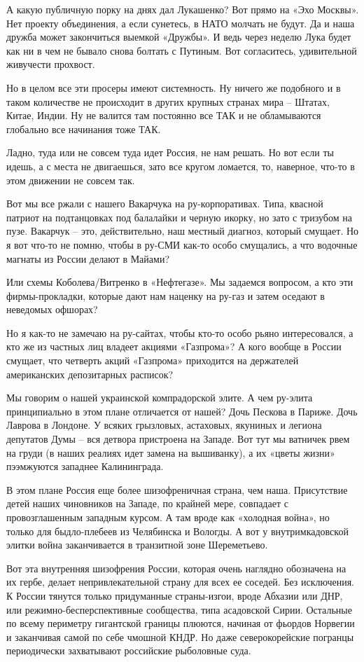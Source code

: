 А какую публичную порку на днях дал Лукашенко? Вот прямо на «Эхо Москвы». Нет
проекту объединения, а если сунетесь, в НАТО молчать не будут. Да и наша дружба
может закончиться выемкой «Дружбы». И ведь через неделю Лука будет как ни в чем
не бывало снова болтать с Путиным. Вот согласитесь, удивительной живучести
прохвост.

Но в целом все эти просеры имеют системность. Ну ничего же подобного и в таком
количестве не происходит в других крупных странах мира – Штатах, Китае, Индии.
Ну не валится там постоянно все ТАК и не обламываются глобально все начинания
тоже ТАК.

Ладно, туда или не совсем туда идет Россия, не нам решать. Но вот если ты
идешь, а с места не двигаешься, зато все кругом ломается, то, наверное, что-то
в этом движении не совсем так.

Вот мы все ржали с нашего Вакарчука на ру-корпоративах. Типа, квасной патриот
на подтанцовках под балалайки и черную икорку, но зато с тризубом на пузе.
Вакарчук – это, действительно, наш местный диагноз, который смущает. Но я вот
что-то не помню, чтобы в ру-СМИ как-то особо смущались, а что водочные магнаты
из России делают в Майами?

Или схемы Коболева/Витренко в «Нефтегазе». Мы задаемся вопросом, а кто эти
фирмы-прокладки, которые дают нам наценку на ру-газ и затем оседают в неведомых
офшорах?

Но я как-то не замечаю на ру-сайтах, чтобы кто-то особо рьяно интересовался, а
кто же из частных лиц владеет акциями «Газпрома»? А кого вообще в России
смущает, что четверть акций «Газпрома» приходится на держателей американских
депозитарных расписок?

Мы говорим о нашей украинской компрадорской элите. А чем ру-элита принципиально
в этом плане отличается от нашей? Дочь Пескова в Париже. Дочь Лаврова в
Лондоне. У всяких грызловых, астаховых, якуниных и легиона депутатов Думы – вся
детвора пристроена на Западе. Вот тут мы ватничек рвем на груди (в наших
реалиях идет замена на вышиванку), а их «цветы жизни» пээмжуются западнее
Калининграда.

В этом плане Россия еще более шизофреничная страна, чем наша. Присутствие детей
наших чиновников на Западе, по крайней мере, совпадает с провозглашенным
западным курсом. А там вроде как «холодная война», но только для быдло-плебеев
из Челябинска и Вологды. А вот у внутримкадовской элитки война заканчивается в
транзитной зоне Шереметьево.

Вот эта внутренняя шизофрения России, которая очень наглядно обозначена на их
гербе, делает непривлекательной страну для всех ее соседей. Без исключения. К
России тянутся только придуманные страны-изгои, вроде Абхазии или ДНР, или
режимно-бесперспективные сообщества, типа асадовской Сирии. Остальные по всему
периметру гигантской границы плюются, начиная от фьордов Норвегии и заканчивая
самой по себе чмошной КНДР. Но даже северокорейские погранцы периодически
захватывают российские рыболовные суда.

